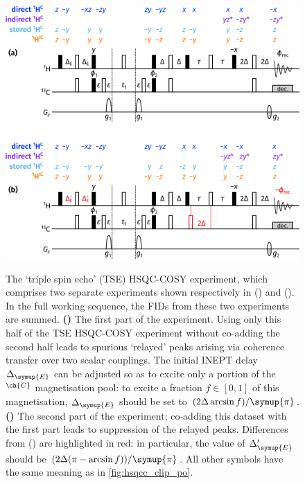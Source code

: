 \documentclass[a4paper,12pt]{article}
\newcommand{\DeltaE}{\Delta_{\symup{E}}}
\newcommand{\magn}[1]{\ch{^1H}$^{\ch{#1}}$}
\newcommand{\cpi}{\symup{\pi}}
\begin{document}
\begin{refsection}
\begin{figure}[!ht]
    \centering
    \includegraphics[]{tse_po.png}%
    {\label{fig:hsqcc_tse_po_1}}%
    {\label{fig:hsqcc_tse_po_2}}%
    \caption[Triple spin echo HSQC-COSY experiment]{
        The `triple spin echo' (TSE) HSQC-COSY experiment, which comprises two separate experiments shown respectively in () and ().
        In the full working sequence, the FIDs from these two experiments are summed.
        \textbf{()} The first part of the experiment.
        Using only this half of the TSE HSQC-COSY experiment without co-adding the second half leads to spurious `relayed' peaks arising via coherence transfer over two scalar couplings.
        The initial INEPT delay $\DeltaE$ can be adjusted so as to excite only a portion of the \magn{C} magnetisation pool: to excite a fraction $f \in [0, 1]$ of this magnetisation, $\DeltaE$ should be set to $(2\Delta \arcsin f)/\cpi$.
        \textbf{()} The second part of the experiment; co-adding this dataset with the first part leads to suppression of the relayed peaks.
        Differences from () are highlighted in red: in particular, the value of $\DeltaE'$ should be $(2\Delta (\pi - \arcsin f))/\cpi$.
        All other symbols have the same meaning as in \cref{fig:hsqcc_clip_po}.
    }
    \label{fig:hsqcc_tse_po}
\end{figure}


\end{refsection}
\end{document}
